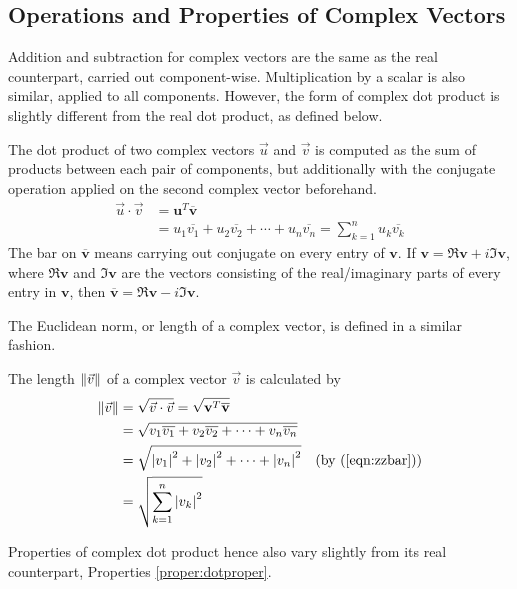 \subsection{Operations and Properties of Complex Vectors}
Addition and subtraction for complex vectors are the same as the real counterpart, carried out component-wise. Multiplication by a scalar is also similar, applied to all components. However, the form of complex dot product is slightly different from the real dot product, as defined below.
\begin{defn}
\label{defn:complexdotproduct}
The dot product of two complex vectors $\vec{u}$ and $\vec{v}$ is computed as the sum of products between each pair of components, but additionally with the conjugate operation applied on the second complex vector beforehand.
\begin{align}
\vec{u} \cdot \vec{v} &= \textbf{u}^T \overline{\textbf{v}} \nonumber \\
&= u_1\overline{v_1} + u_2\overline{v_2} + \cdots + u_n\overline{v_n} = \sum_{k=1}^{n} u_k\overline{v_k}
\end{align}
The bar on $\overline{\textbf{v}}$ means carrying out conjugate on every entry of $\textbf{v}$. If $\textbf{v} = \Re{\textbf{v}} + i\Im{\textbf{v}}$, where $\Re{\textbf{v}}$ and $\Im{\textbf{v}}$ are the vectors consisting of the real/imaginary parts of every entry in $\textbf{v}$, then $\overline{\textbf{v}} = \Re{\textbf{v}} - i\Im{\textbf{v}}$.
\end{defn}
The Euclidean norm, or length of a complex vector, is defined in a similar fashion.
\begin{defn}
The length $\norm{\vec{v}}$ of a complex vector $\vec{v}$ is calculated by
\begin{align}
\norm{\vec{v}} &= \sqrt{\vec{v} \cdot \vec{v}} = \sqrt{\textbf{v}^T \overline{\textbf{v}}} \nonumber \\
&= \sqrt{v_1\overline{v_1} + v_2\overline{v_2} + \cdots + v_n\overline{v_n}} \nonumber\\
&= \sqrt{\abs{v_1}^2 + \abs{v_2}^2 + \cdots + \abs{v_n}^2} & \text{(by (\ref{eqn:zzbar}))} \nonumber \\
&= \sqrt{\sum_{k=1}^{n} \abs{v_k}^2}
\end{align}
\end{defn}
Properties of complex dot product hence also vary slightly from its real counterpart, Properties \ref{proper:dotproper}.
